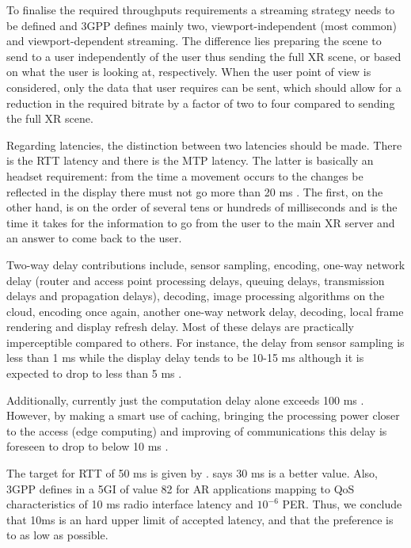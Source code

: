 To finalise the required throughputs requirements a streaming strategy needs to be defined and 3GPP \cite{3GPP_xr} defines mainly two, viewport-independent (most common) and viewport-dependent streaming. The difference lies preparing the scene to send to a user independently of the user thus sending the full XR scene, or based on what the user is looking at, respectively. When the user point of view is considered, only the data that user requires can be sent, which should allow for a reduction in the required bitrate by a factor of two to four compared to sending the full XR scene. 


Regarding latencies, the distinction between two latencies should be made. There is the \ac{RTT} latency and there is the \ac{MTP} latency. The latter is basically an headset requirement: from the time a movement occurs to the changes be reflected in the display there must not go more than 20 ms \cite{3GPP_xr, Elbamby_towards_low_latency_vr}. The first, on the other hand, is on the order of several tens or hundreds of milliseconds and is the time it takes for the information to go from the user to the main XR server and an answer to come back to the user. %


Two-way delay contributions include, sensor sampling, encoding, one-way network delay (router and access point processing delays, queuing delays, transmission delays and propagation delays), decoding, image processing algorithms on the cloud, encoding once again, another one-way network delay, decoding, local frame rendering and display refresh delay. Most of these delays are practically imperceptible compared to others. For instance, the delay from sensor sampling is less than 1 ms while the display delay tends to be 10-15 ms \cite{bastug_towards_interconnected_vr} although it is expected to drop to less than 5 ms \cite{vr_on_the_edge}. 

Additionally, currently just the computation delay alone exceeds 100 ms \cite{vr_on_the_edge}. However, by making a smart use of caching, bringing the processing power closer to the access (edge computing) and improving of communications \cite{Elbamby_towards_low_latency_vr, bastug_towards_interconnected_vr, 3GPP_xr} this delay is foreseen to drop to below 10 ms \cite{vr_on_the_edge}. 

The target for \ac{RTT} of 50 ms is given by \cite{3GPP_xr}. \cite{vr_on_the_edge} says 30 ms is a better value. Also, 3GPP defines in \cite{3GPP_xr} a \ac{5GI} of value 82 for \ac{AR} applications mapping to \ac{QoS} characteristics of 10 ms radio interface latency and $10^{-6}$ \ac{PER}. Thus, we conclude that 10ms is an hard upper limit of accepted latency, and that the preference is to as low as possible.

